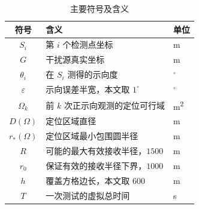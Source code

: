 \begin{table}[htbp]
  \centering
  \caption{主要符号及含义}
  \begin{tabular}{cll}
    \toprule
    符号 & 含义 & 单位 \\
    \midrule
    $S_i$ & 第 $i$ 个检测点坐标 & \unit{m} \\
    $G$ & 干扰源真实坐标 & \unit{m} \\
    $\theta_i$ & 在 $S_i$ 测得的示向度 & $^\circ$ \\
    $\varepsilon$ & 示向误差半宽，本文取 $1^\circ$ & $^\circ$ \\
    $\Omega_k$ & 前 $k$ 次正示向观测的定位可行域 & \unit{m^2} \\
    $D(\Omega)$ & 定位区域直径 & \unit{m} \\
    $r_*(\Omega)$ & 定位区域最小包围圆半径 & \unit{m} \\
    $R$ & 可能的最大有效接收半径，$1500$ & \unit{m} \\
    $r_0$ & 保证有效的接收半径下界，$1000$ & \unit{m} \\
    $h$ & 覆盖方格边长，本文取 $600$ & \unit{m} \\
    $T$ & 一次测试的虚拟总时间 & \unit{s} \\
    \bottomrule
  \end{tabular}
\end{table}

